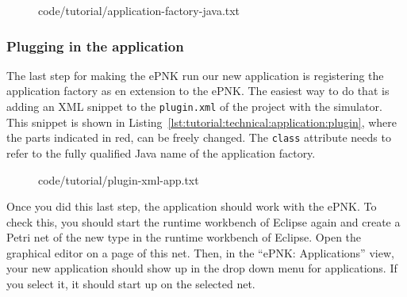 \begin{figure}[htbp!]
%
  {code/tutorial/application-factory-java.txt}
\end{figure}

\subsubsection{Plugging in the application}
\label{subsubsec:tutorial:technical:application:plugin}

The last step for making the ePNK run our new application is registering
the application factory as en extension to the ePNK. The easiest way to do
that is adding an XML snippet to the {\tt plugin.xml} of the project with the
simulator. This snippet is shown in
Listing~\ref{lst:tutorial:technical:application:plugin}, where the parts
indicated in red, can be freely changed. The {\tt class} attribute needs to
refer to the fully qualified Java name of the application factory.

\begin{figure}[htbp!]
%
  {code/tutorial/plugin-xml-app.txt}
\end{figure}

Once you did this last step, the application should work with the ePNK. To check
this, you should start the runtime workbench of Eclipse again and create a Petri
net of the new type in the runtime workbench of Eclipse. Open the graphical
editor on a page of this net. Then, in the ``ePNK: Applications'' view, your new
application should show up in the drop down menu for applications. If you
select it, it should start up on the selected net.

\endinput

\section{Discussion}

\subsection{Changes in version 1.1}

\subsection{Methodology}





